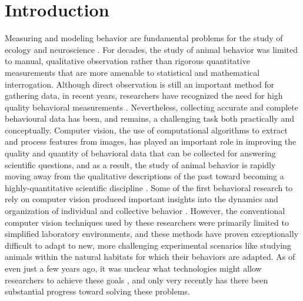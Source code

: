 	\chapter*{Introduction}
Measuring and modeling behavior are fundamental problems for the study of ecology and neuroscience \citep{berman2018measuring, brown2018ethology}. For decades, the study of animal behavior was limited to manual, qualitative observation rather than rigorous quantitative measurements that are more amenable to statistical and mathematical interrogation. Although direct observation is still an important method for gathering data, in recent years, researchers have recognized the need for high quality behavioral measurements \citep{anderson2014toward, dell2014automated, berman2018measuring, pereira2020quantifying}. Nevertheless, collecting accurate and complete behavioural data has been, and remains, a challenging task both practically and conceptually. Computer vision, the use of computational algorithms to extract and process features from images, has played an important role in improving the quality and quantity of behavioral data that can be collected for answering scientific questions, and as a result, the study of animal behavior is rapidly moving away from the qualitative descriptions of the past toward becoming a highly-quantitative scientific discipline \citep{anderson2014toward, berman2018measuring, pereira2020quantifying}. Some of the first behavioral research to rely on computer vision produced important insights into the dynamics and organization of individual \citep{stephens2008dimensionality, berman2014mapping, berman2016predictability} and collective behavior \citep{buhl2006disorder, strandburg2013visual, rosenthal2015revealing}. However, the conventional computer vision techniques used by these researchers were primarily limited to simplified laboratory environments, and these methods have proven exceptionally difficult to adapt to new, more challenging experimental scenarios like studying animals within the natural habitats for which their behaviors are adapted. As of even just a few years ago, it was unclear what technologies might allow researchers to achieve these goals \citep{dell2014automated}, and only very recently has there been substantial progress toward solving these problems.

